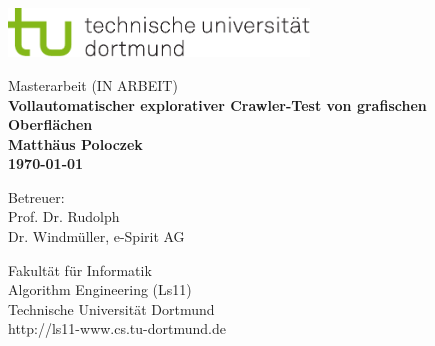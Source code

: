 \begin{titlepage}
\vspace*{-2cm}
\newlength{\links}
\setlength{\links}{-1.5cm}
\sf
\LARGE

\hspace*{\links}
\begin{minipage}{12.5cm}
\includegraphics[width=8cm]{bilder/tulogo-rgb}
\end{minipage}

\vspace*{4cm}

\hspace*{\links}
\hspace*{-0.2cm}
\begin{minipage}{9cm}
\large
\begin{center}
{\Large Masterarbeit (IN ARBEIT)} \\
\vspace*{1cm}
\bf{ Vollautomatischer explorativer Crawler-Test von grafischen Oberflächen } \\
\vspace*{1cm}
Matthäus Poloczek\\
\today
\end{center}
\end{minipage}

\vspace*{5.5cm}

\hspace*{\links}

\vspace*{1.5cm}

\vspace*{.6cm}

\hspace*{\links}
\begin{minipage}[b]{5cm}
\normalsize
\raggedright
Betreuer: \\
Prof. Dr. Rudolph \\
Dr. Windmüller, e-Spirit AG \\
\end{minipage}

\vspace*{2.5cm}
\hspace*{\links}
\begin{minipage}[b]{8cm}
\normalsize
\raggedright
Fakultät für Informatik\\
Algorithm Engineering (Ls11)\\
Technische Universität Dortmund \\
http://ls11-www.cs.tu-dortmund.de
\end{minipage}


\end{titlepage}
